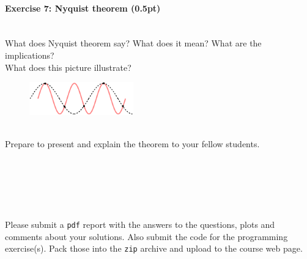 \documentclass[a4paper,11pt]{article}
\newenvironment{exercise}[3]{\paragraph{Exercise #1: #2 (#3pt)}\ \\}{
\medskip}
\begin{document}
%
%
\begin{exercise}{7}{Nyquist theorem}{0.5}
What does Nyquist theorem say? What does it mean? What are the implications?\\
What does this picture illustrate?
\begin{figure}[H]
   \includegraphics[width=0.4\textwidth]{nyquist.png} 
\end{figure}
\ \\
Prepare to present and explain the theorem to your fellow students.
\end{exercise}
\ \\
\ \\
\ \\
\ \\
\ \\
Please submit a \texttt{pdf} report with the answers to the questions, plots and comments about your solutions. Also submit the code for the programming exercise(s). Pack those into the \texttt{zip} archive and upload to the course web page.
\end{document}
